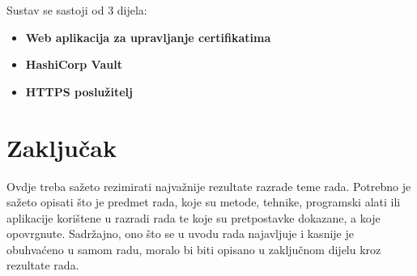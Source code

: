 \documentclass[]{foi}
\begin{document}
Sustav se sastoji od 3 dijela:
\begin{itemize}
  \item \textbf{Web aplikacija za upravljanje certifikatima}
  \item \textbf{HashiCorp Vault}
  \item \textbf{HTTPS poslužitelj}
\end{itemize}

\chapter{Zaključak}

Ovdje treba sažeto rezimirati najvažnije rezultate razrade teme rada. Potrebno je sažeto opisati što je predmet rada, koje su metode, tehnike, programski alati ili aplikacije korištene u razradi rada te koje su pretpostavke dokazane, a koje opovrgnute. Sadržajno, ono što se u uvodu rada najavljuje i kasnije je obuhvaćeno u samom radu, moralo bi biti opisano u zaključnom dijelu kroz rezultate rada.

\makebackmatter



\end{document}
